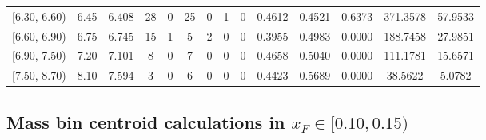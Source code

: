 \begin{table}[htbp]
{\begin{tabular}{cc|c|cccccc|ccc|cc}
        {[6.30, 6.60)} & 6.45 & 6.408 & 28 & 0 & 25 & 0 & 1 & 0 & 0.4612 & 0.4521 & 0.6373 & 371.3578 & 57.9533 \\
        {[6.60, 6.90)} & 6.75 & 6.745 & 15 & 1 & 5 & 2 & 0 & 0 & 0.3955 & 0.4983 & 0.0000 & 188.7458 & 27.9851 \\
        {[6.90, 7.50)} & 7.20 & 7.101 & 8 & 0 & 7 & 0 & 0 & 0 & 0.4658 & 0.5040 & 0.0000 & 111.1781 & 15.6571 \\
        {[7.50, 8.70)} & 8.10 & 7.594 & 3 & 0 & 6 & 0 & 0 & 0 & 0.4423 & 0.5689 & 0.0000 & 38.5622 & 5.0782 \\
        \hline\hline
    \end{tabular}
    }
\end{table}

\clearpage
\subsection{\texorpdfstring{Mass bin centroid calculations in $x_F \in [0.10, 0.15)$}{Mass bin centroid calculations in x\_F in [0.10, 0.15)]}}

